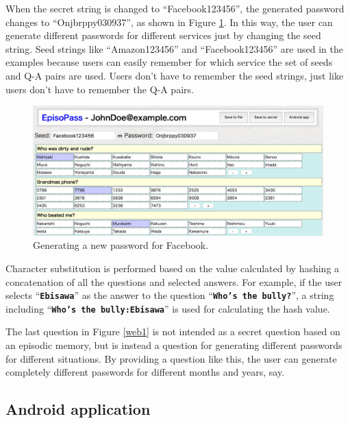 \documentclass[runningheads,a4paper]{llncs}
\begin{document}
When the secret string is changed to ``\textsf{Facebook123456}'',
the generated password changes to ``\textsf{Onjbrppy030937}'',
as shown in Figure \ref{web2}.
In this way, the user can generate different passwords for
different services just by changing the seed string.
Seed strings like ``\textsf{Amazon123456}'' and ``\textsf{Facebook123456}'' are used
in the examples because users can easily remember
for which service the set of seeds and Q-A pairs are used.
Users don't have to remember the seed strings,
just like users don't have to remember the Q-A pairs.

\begin{figure}
  \centering
  \includegraphics[width=1.0\columnwidth]{figures/ab4517dd593c1cabab5fecef546f7e88}
  \caption{Generating a new password for Facebook.}
  \label{web2}
\end{figure}

Character substitution is performed based on the value
calculated by hashing a concatenation of all the questions and selected answers.
%
For example, if the user selects ``\textbf{\texttt{Ebisawa}}''
as the answer to the question ``\textbf{\texttt{Who's the bully?}}'',
a string including ``\textbf{\texttt{Who's the bully:Ebisawa}}''
is used for calculating the hash value.

The last question in Figure \ref{web1} is not intended as a secret question based on an
episodic memory, but is instead a question
for generating different passwords for different situations.
By providing a question like this, the user can generate completely different passwords
for different months and years, say.

\subsection{Android application}

\end{document}
